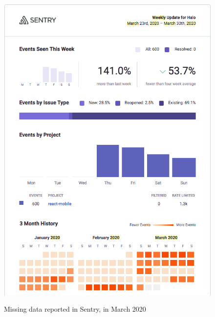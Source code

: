 \begin{figure}[htbp!]
\begin{minipage}{.45\textwidth}
  \includegraphics[width=\textwidth]{images/localhalo/sentry-weekly-report-23-mar-2020.png}
  \label{fig:localhalo-sentry-weekly-report-23-mar-2020}
\end{minipage}
    \caption{Missing data reported in Sentry, in March 2020}
    \label{fig:sentry-missing-data-march-2020}
\end{figure}
